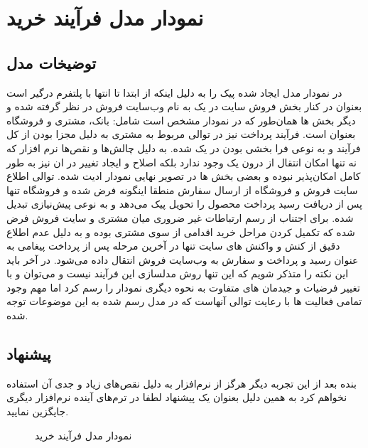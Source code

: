 \documentclass[12pt,onecolumn,a4paper]{article}
\begin{document}
\newpage
\tableofcontents
\newpage
\listoffigures
\newpage


\section{نمودار مدل فرآیند خرید}
\subsection{توضیخات مدل }

در نمودار مدل ایجاد شده پیک را به دلیل اینکه از ابتدا تا انتها با پلتفرم درگیر است بعنوان   در کنار بخش فروش سایت در یک  به نام وب‌سایت فروش در نظر گرفته شده و دیگر بخش ها همان‌‌طور که در نمودار مشخص است شامل: بانک، مشتری و فروشگاه بعنوان  است.
فرآیند پرداخت نیز در توالی مربوط به مشتری به دلیل مجزا بودن از کل فرآیند و به نوعی فرا بخشی بودن در یک  شده.
به دلیل چالش‌ها و نقص‌ها نرم افزار  که نه تنها امکان انتقال از درون یک  وجود ندارد بلکه اصلاح و ایجاد تغییر در ان نیز به طور کامل امکان‌پذیر نبوده و بعضی بخش ها در تصویر نهایی نمودار ادیت شده.
توالی اطلاع سایت فروش و فروشگاه از ارسال سفارش منطقا اینگونه  فرض شده و فروشگاه تنها پس از دریافت رسید پرداخت محصول را تحویل پیک می‌دهد و به نوعی پیش‌نیازی تبدیل شده.
 برای اجتناب از رسم ارتباطات غیر ضروری میان مشتری و سایت فروش فرض شده که تکمیل کردن مراحل خرید اقدامی از سوی مشتری بوده و به دلیل عدم اطلاع دقیق از کنش و واکنش های سایت تنها در آخرین مرحله پس از پرداخت پیغامی به عنوان رسید و پرداخت و سفارش به وب‌سایت فروش انتقال داده می‌شود.
در آخر باید این نکته را متذکر شویم که این تنها روش مدلسازی این فرآیند نیست و می‌توان و با تغییر فرضیات و جیدمان های متفاوت به نحوه دیگری نمودار را رسم کرد اما مهم وجود تمامی فعالیت ها با رعایت توالی آنهاست که در مدل رسم شده به این موضوعات توجه شده.


\subsection{پیشنهاد }
بنده بعد از این تجربه دیگر هرگز از نرم‌افزار  به دلیل نقص‌های زیاد و جدی آن استفاده نخواهم کرد به همین دلیل بعنوان یک پیشنهاد لطفا در ترم‌های آینده نرم‌افزار دیگری جایگزین نمایید.

\newpage
\begin{figure}[!h]
\caption{نمودار مدل فرآیند خرید}\label{sellbpmnpng}
\end{figure}
\end{document}
